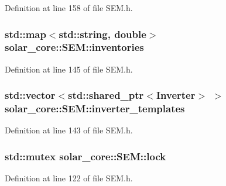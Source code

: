 Definition at line 158 of file S\+E\+M.\+h.

\hypertarget{classsolar__core_1_1_s_e_m_a2fa619a45dc7e3ecc29026042337bd2d}{}
\subsubsection[{inventories}]{\setlength{\rightskip}{0pt plus 5cm}std\+::map$<$std\+::string, double$>$ solar\+\_\+core\+::\+S\+E\+M\+::inventories\hspace{0.3cm}{\ttfamily [protected]}}\label{classsolar__core_1_1_s_e_m_a2fa619a45dc7e3ecc29026042337bd2d}


Definition at line 145 of file S\+E\+M.\+h.

\hypertarget{classsolar__core_1_1_s_e_m_acd9f1a494059476a06de5cb4fe9f750a}{}
\subsubsection[{inverter\+\_\+templates}]{\setlength{\rightskip}{0pt plus 5cm}std\+::vector$<$std\+::shared\+\_\+ptr$<${\bf Inverter}$>$ $>$ solar\+\_\+core\+::\+S\+E\+M\+::inverter\+\_\+templates\hspace{0.3cm}{\ttfamily [protected]}}\label{classsolar__core_1_1_s_e_m_acd9f1a494059476a06de5cb4fe9f750a}


Definition at line 143 of file S\+E\+M.\+h.

\hypertarget{classsolar__core_1_1_s_e_m_a4b62648f9638185e279a801b8c0eb39b}{}
\subsubsection[{lock}]{\setlength{\rightskip}{0pt plus 5cm}std\+::mutex solar\+\_\+core\+::\+S\+E\+M\+::lock\hspace{0.3cm}{\ttfamily [protected]}}\label{classsolar__core_1_1_s_e_m_a4b62648f9638185e279a801b8c0eb39b}


Definition at line 122 of file S\+E\+M.\+h.

